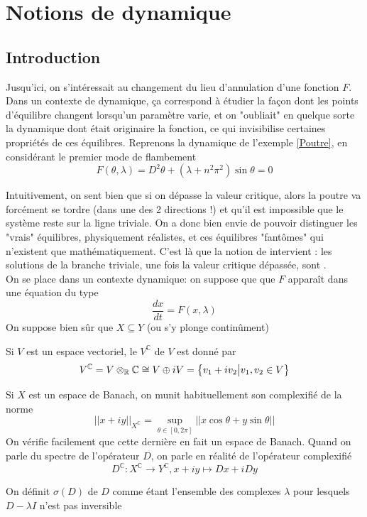 \documentclass[memoire.tex]{subfiles}
\begin{document}
\section{Notions de dynamique}
\subsection{Introduction}
Jusqu'ici, on s'intéressait au changement du lieu d'annulation d'une fonction $F$. Dans un contexte de dynamique, ça correspond à étudier la façon dont les points d'équilibre changent lorsqu'un paramètre varie, et on "oubliait" en quelque sorte la dynamique dont était originaire la fonction, ce qui invisibilise certaines propriétés de ces équilibres. Reprenons la dynamique de l'exemple \ref{Poutre}, en considérant le premier mode de flambement
\begin{equation*}
    F(\theta,\lambda)=D^2 \theta + (\lambda+n^2\pi^2) \sin\theta =0
\end{equation*}

Intuitivement, on sent bien que si on dépasse la valeur 
critique, alors la poutre va forcément se tordre 
(dans une des 2 directions !) et qu'il est impossible que 
le système reste sur la ligne triviale. On a donc bien 
envie de pouvoir distinguer les "vrais" équilibres, 
physiquement réalistes, et ces équilibres "fantômes" qui 
n'existent que mathématiquement. C'est là que la notion de 
 intervient : les solutions de la branche 
triviale, une fois la valeur critique dépassée, sont 
.\\
On se place dans un contexte dynamique: on suppose que que $F$ apparaît dans une équation du type
\begin{equation*}
    \frac{dx}{dt}=F(x,\lambda)
\end{equation*}
On suppose bien sûr que $X\subseteq Y$ (ou s'y plonge continûment)
\begin{definition}
    Si $V$ est un espace vectoriel, le  $V^{\mathbb{C}}$ de $V$ est donné par 
    \begin{equation*}
        V^{\mathbb{C}}=V\otimes_{\mathbb{R}}\mathbb{C}\cong V\oplus i V=\left\{ v_1+iv_2\big| v_1,v_2\in V\right\}
    \end{equation*}
\end{definition}
Si $X$ est un espace de Banach, on munit habituellement son complexifié de la norme 
\begin{equation*}
    ||x+iy||_{X^\mathbb{C}}= \sup_{\theta\in[0,2\pi]} ||x\cos\theta + y\sin \theta ||
\end{equation*}
On vérifie facilement que cette dernière en fait un espace 
de Banach. Quand on parle du spectre de l'opérateur $D$, on parle en réalité de l'opérateur complexifié 
\begin{equation*}
    D^{\mathbb{C}}: X^{\mathbb{C}}\rightarrow Y^{\mathbb{C}}
, x+iy\mapsto Dx +iDy
\end{equation*}
\begin{definition}
    On définit $\sigma(D)$  de $D$ comme étant l'ensemble des complexes $\lambda$ pour lesquels $D-\lambda I$ n'est pas inversible
\end{definition}
\end{document}
